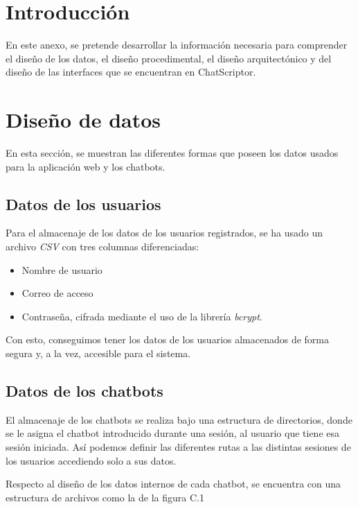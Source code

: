 
\section{Introducción}
En este anexo, se pretende desarrollar la información necesaria para comprender el diseño de los datos, el diseño procedimental, el diseño arquitectónico y del diseño de las interfaces que se encuentran en ChatScriptor.

\section{Diseño de datos}
En esta sección, se muestran las diferentes formas que poseen los datos usados para la aplicación web y los chatbots.

\subsection{Datos de los usuarios}
Para el almacenaje de los datos de los usuarios registrados, se ha usado un archivo \textit{CSV} con tres columnas diferenciadas: 
\begin{itemize}
    \item Nombre de usuario
    \item Correo de acceso
    \item Contraseña, cifrada mediante el uso de la librería \textit{bcrypt}.
\end{itemize}

Con esto, conseguimos tener los datos de los usuarios almacenados de forma segura y, a la vez, accesible para el sistema.

\subsection{Datos de los chatbots}
El almacenaje de los chatbots se realiza bajo una estructura de directorios, donde se le asigna el chatbot introducido durante una sesión, al usuario que tiene esa sesión iniciada. Así podemos definir las diferentes rutas a las distintas sesiones de los usuarios accediendo solo a sus datos.

Respecto al diseño de los datos internos de cada chatbot, se encuentra con una estructura de archivos como la de la figura C.1

